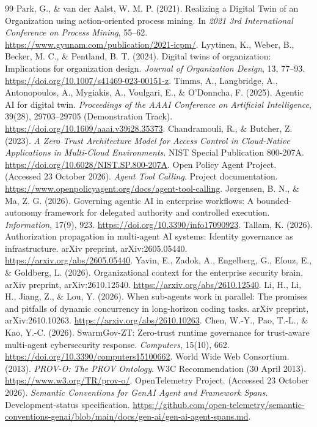 \documentclass[11pt,letterpaper]{article}
\begin{document}
\begin{thebibliography}{99}
 Park, G., \& van der Aalst, W. M. P. (2021). Realizing a Digital Twin of an Organization using action-oriented process mining. In \emph{2021 3rd International Conference on Process Mining}, 55--62. \url{https://www.gyunam.com/publication/2021-icpm/}.
 Lyytinen, K., Weber, B., Becker, M. C., \& Pentland, B. T. (2024). Digital twins of organization: Implications for organization design. \emph{Journal of Organization Design}, 13, 77--93. \url{https://doi.org/10.1007/s41469-023-00151-z}.
 Timms, A., Langbridge, A., Antonopoulos, A., Mygiakis, A., Voulgari, E., \& O'Donncha, F. (2025). Agentic AI for digital twin. \emph{Proceedings of the AAAI Conference on Artificial Intelligence}, 39(28), 29703--29705 (Demonstration Track). \url{https://doi.org/10.1609/aaai.v39i28.35373}.
 Chandramouli, R., \& Butcher, Z. (2023). \emph{A Zero Trust Architecture Model for Access Control in Cloud-Native Applications in Multi-Cloud Environments}. NIST Special Publication 800-207A. \url{https://doi.org/10.6028/NIST.SP.800-207A}.
 Open Policy Agent Project. (Accessed 23 October 2026). \emph{Agent Tool Calling}. Project documentation. \url{https://www.openpolicyagent.org/docs/agent-tool-calling}.
 J{\o}rgensen, B. N., \& Ma, Z. G. (2026). Governing agentic AI in enterprise workflows: A bounded-autonomy framework for delegated authority and controlled execution. \emph{Information}, 17(9), 923. \url{https://doi.org/10.3390/info17090923}.
 Tallam, K. (2026). Authorization propagation in multi-agent AI systems: Identity governance as infrastructure. arXiv preprint, arXiv:2605.05440. \url{https://arxiv.org/abs/2605.05440}.
 Yavin, E., Zadok, A., Engelberg, G., Elouz, E., \& Goldberg, L. (2026). Organizational context for the enterprise security brain. arXiv preprint, arXiv:2610.12540. \url{https://arxiv.org/abs/2610.12540}.
 Li, H., Li, H., Jiang, Z., \& Lou, Y. (2026). When sub-agents work in parallel: The promises and pitfalls of dynamic concurrency in long-horizon coding tasks. arXiv preprint, arXiv:2610.10263. \url{https://arxiv.org/abs/2610.10263}.
 Chen, W.-Y., Pao, T.-L., \& Kao, Y.-C. (2026). SwarmGov-ZT: Zero-trust runtime governance for trust-aware multi-agent cybersecurity response. \emph{Computers}, 15(10), 662. \url{https://doi.org/10.3390/computers15100662}.
 World Wide Web Consortium. (2013). \emph{PROV-O: The PROV Ontology}. W3C Recommendation (30 April 2013). \url{https://www.w3.org/TR/prov-o/}.
 OpenTelemetry Project. (Accessed 23 October 2026). \emph{Semantic Conventions for GenAI Agent and Framework Spans}. Development-status specification. \url{https://github.com/open-telemetry/semantic-conventions-genai/blob/main/docs/gen-ai/gen-ai-agent-spans.md}.
\end{thebibliography}
\end{document}
